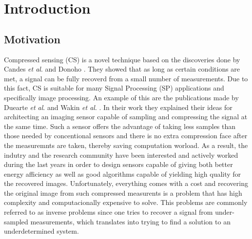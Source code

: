 \chapter{Introduction}
\section{Motivation}
Compressed sensing (CS) is a novel technique based on the discoveries done by Candes \textit{et al}. \cite{CandesR07} and Donoho \cite{Donoho01}. They showed that as long as certain conditions are met, a signal can be fully recoverd from a small number of measurements. Due to this fact, CS is suitable for many Signal Processing (SP) applications and specifically image processing. An example of this are the publications made by Duearte \textit{et al}. and Wakin \textit{et al}. \cite{duarte2008single,wakin2006architecture}. In their work they explained their ideas for architecting an imaging sensor capable of sampling and compressing the signal at the same time. Such a sensor offers the advantage of taking less samples than those needed by concentional sensors and there is no extra compression face after the measuremnts are taken, thereby saving computation worload. As a result, the indutry and the research community have been interested and actively worked during the last years in order to design sensors capable of giving both better energy afficiency as well as good algorithms capable of yielding high quality for the recovered images. Unfortunately, everything comes with a cost and recovering the original image from such compressed measurents is a problem that has high complexity and computacionally expensive to solve. This problems are commonly referred to as inverse problems since one tries to recover a signal from under-sampled measurements, which translates into trying to find a solution to an underdetermined system. \


